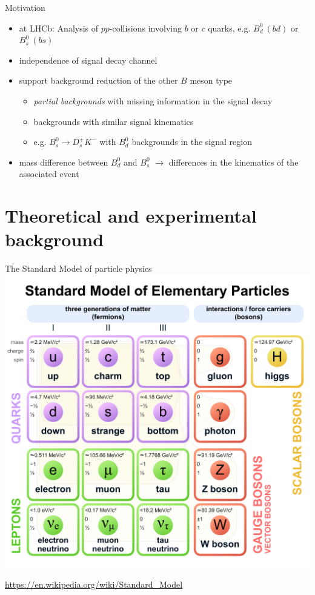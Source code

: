 \documentclass[aspectratio=1610, 10pt]{beamer}
\begin{document}
\begin{frame}{Motivation}
  \begin{itemize}
    \item at LHCb: Analysis of $pp$-collisions involving $b$ or $c$ quarks, e.g. $B^0_d \: (bd)$ or $B^0_s \: (bs)$
    \item independence of signal decay channel
    \item support background reduction of the other $B$ meson type
    \begin{itemize}
      \item \textit{partial backgrounds} with missing information in the signal decay
      \item backgrounds with similar signal kinematics
      \item e.g. $B^0_s \rightarrow D^+_s K^-$ with $B^0_d$ backgrounds in the signal region
    \end{itemize}
    \item mass difference between $B^0_d$ and $B^0_s$ $\rightarrow$ differences in the kinematics of the associated event
  \end{itemize}
\end{frame}

\section*{Theoretical and experimental background}

\begin{frame}{The Standard Model of particle physics}
  \centering
  \includegraphics[height=0.9\textheight]{images/standard_model.pdf}

  \tiny \url{https://en.wikipedia.org/wiki/Standard_Model}
\end{frame}
\end{document}

